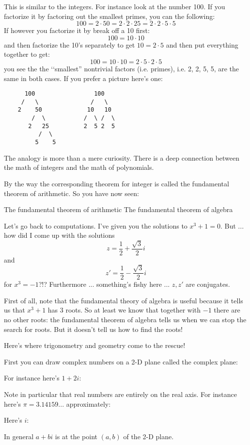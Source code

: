 This is similar to the integers.
For instance look at the number 100.
If you factorize it by factoring out the smallest primes, you can
the following:
\[
100 = 2 \cdot 50 = 2 \cdot 2 \cdot 25 = 2 \cdot 2 \cdot 5 \cdot 5
\]
If however you factorize it by break off a 10 first:
\[
100 = 10 \cdot 10
\]
and then factorize the 10's separately to get $10 = 2 \cdot 5$ and then 
put everything together to get:
\[
100 = 10 \cdot 10 = 2 \cdot 5 \cdot 2 \cdot 5
\]
you see the the \lq\lq smallest'' nontrivial factors
(i.e. primes), i.e. 2, 2, 5, 5, are the same
in both cases.
If you prefer a picture here's one:
\begin{verbatim}
      100                 100
     /   \               /   \
    2    50             10   10
        /  \           /  \ /  \
       2   25          2  5 2  5
          /  \
         5    5
\end{verbatim}

The analogy is more than a mere curiosity. 
There is a deep connection between the math of integers and the
math of polynomials.

By the way the corresponding theorem for integer is called
the fundamental theorem of arithmetic.
So you have now seen:
\begin{enumerate}[nosep]
\li The fundamental theorem of arithmetic
\li The fundamental theorem of algebra
\end{enumerate}

Let's go back to computations.
I've given you the solutions to $x^3 + 1 = 0$.
But ...
how did I come up with the solutions
\[
z = \frac{1}{2} + \frac{\sqrt{3}}{2}i
\]
and
\[
z' = \frac{1}{2} - \frac{\sqrt{3}}{2}i
\] 
for $x^3 = -1$?!?
Furthermore ... something's fishy here ...
$z,z'$ are conjugates.

First of all, note that the fundamental theory of algebra is useful
because it tells us that $x^3 + 1$ has 3 roots.
So at least we know that together with $-1$ there are no other roots:
the fundamental theorem of algebra tells us when we can stop the search for
roots.
But it doesn't tell us how to find the roots!

Here's where trigonometry and geometry come to the rescue!

First you can draw complex numbers on a 2-D plane called the complex
plane:

For instance here's $1 + 2i$:

Note in particular that real numbers are entirely on the real axis.
For instance here's $\pi = 3.14159...$ approximately:

Here's $i$:

In general $a + bi$ is at the point $(a,b)$ of the 2-D plane.


